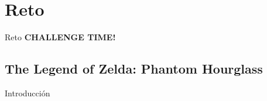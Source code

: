 \section{Reto}
\begin{frame}{Reto}
    \Huge\centering\textbf{CHALLENGE TIME!}
\end{frame}

\subsection{The Legend of Zelda: Phantom Hourglass}
\begin{frame}{Introducción}
\end{frame}
